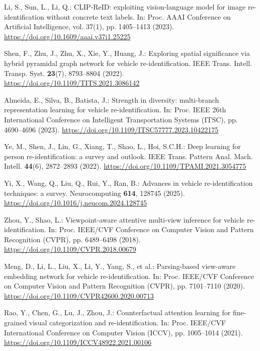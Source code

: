 Li, S., Sun, L., Li, Q.: CLIP-ReID: exploiting vision-language model for image
re-identification without concrete text labels. In: Proc. AAAI Conference on
Artificial Intelligence, vol. 37(1), pp. 1405--1413 (2023).
\url{https://doi.org/10.1609/aaai.v37i1.25225}

Shen, F., Zhu, J., Zhu, X., Xie, Y., Huang, J.: Exploring spatial significance
via hybrid pyramidal graph network for vehicle re-identification. IEEE Trans.
Intell. Transp. Syst. \textbf{23}(7), 8793--8804 (2022).
\url{https://doi.org/10.1109/TITS.2021.3086142}

Almeida, E., Silva, B., Batista, J.: Strength in diversity: multi-branch
representation learning for vehicle re-identification. In: Proc. IEEE 26th
International Conference on Intelligent Transportation Systems (ITSC),
pp. 4690--4696 (2023). \url{https://doi.org/10.1109/ITSC57777.2023.10422175}

Ye, M., Shen, J., Lin, G., Xiang, T., Shao, L., Hoi, S.C.H.: Deep learning for
person re-identification: a survey and outlook. IEEE Trans. Pattern Anal. Mach.
Intell. \textbf{44}(6), 2872--2893 (2022).
\url{https://doi.org/10.1109/TPAMI.2021.3054775}

Yi, X., Wang, Q., Liu, Q., Rui, Y., Ran, B.: Advances in vehicle
re-identification techniques: a survey. Neurocomputing \textbf{614}, 128745
(2025). \url{https://doi.org/10.1016/j.neucom.2024.128745}

Zhou, Y., Shao, L.: Viewpoint-aware attentive multi-view inference for vehicle
re-identification. In: Proc. IEEE/CVF Conference on Computer Vision and Pattern
Recognition (CVPR), pp. 6489--6498 (2018).
\url{https://doi.org/10.1109/CVPR.2018.00679}

Meng, D., Li, L., Liu, X., Li, Y., Yang, S., et al.: Parsing-based view-aware
embedding network for vehicle re-identification. In: Proc. IEEE/CVF Conference
on Computer Vision and Pattern Recognition (CVPR), pp. 7101--7110 (2020).
\url{https://doi.org/10.1109/CVPR42600.2020.00713}

Rao, Y., Chen, G., Lu, J., Zhou, J.: Counterfactual attention learning for
fine-grained visual categorization and re-identification. In: Proc. IEEE/CVF
International Conference on Computer Vision (ICCV), pp. 1005--1014 (2021).
\url{https://doi.org/10.1109/ICCV48922.2021.00106}

